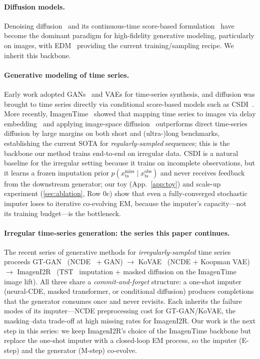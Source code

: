 \documentclass{article}
\theoremstyle{plain}
\theoremstyle{definition}
\theoremstyle{remark}
\newcommand{\xts}{x_{\mathrm{ts}}}
\begin{document}
\paragraph{Diffusion models.}
Denoising diffusion~\citep{ho2020ddpm} and its continuous-time score-based formulation~\citep{song2021sde} have become the dominant paradigm for high-fidelity generative modeling, particularly on images, with EDM~\citep{karras2022edm} providing the current training/sampling recipe. We inherit this backbone.

\paragraph{Generative modeling of time series.}
Early work adopted GANs~\citep{yoon2019timegan} and VAEs for time-series synthesis, and diffusion was brought to time series directly via conditional score-based models such as CSDI~\citep{tashiro2021csdi}. More recently, ImagenTime~\citep{naiman2024imagentime} showed that mapping time series to images via delay embedding~\citep{takens1981embedding} and applying image-space diffusion~\citep{karras2022edm} outperforms direct time-series diffusion by large margins on both short and (ultra-)long benchmarks, establishing the current SOTA for \emph{regularly-sampled} sequences; this is the backbone our method trains end-to-end on irregular data. CSDI is a natural baseline for the irregular setting because it trains on incomplete observations, but it learns a frozen imputation prior $p(\xts^{\mathrm{miss}} \mid \xts^{\mathrm{obs}})$ and never receives feedback from the downstream generator; our toy (App.~\ref{app:toy}) and scale-up experiment (\cref{sec:ablation}, Row 0c) show that even a fully-converged stochastic imputer loses to iterative co-evolving EM, because the imputer's capacity—not its training budget—is the bottleneck.

\paragraph{Irregular time-series generation: the series this paper continues.}
The recent series of generative methods for \emph{irregularly-sampled} time series proceeds GT-GAN~\citep{jeon2022gtgan} (NCDE~\citep{kidger2020ncde} + GAN) $\rightarrow$ KoVAE~\citep{naiman2024kovae} (NCDE + Koopman VAE) $\rightarrow$ ImagenI2R~\citep{fadlon2025imageni2r} (TST~\citep{zerveas2021tst} imputation + masked diffusion on the ImagenTime image lift). All three share a \emph{commit-and-forget} structure: a one-shot imputer (neural-CDE, masked transformer, or conditional diffusion) produces completions that the generator consumes once and never revisits. Each inherits the failure modes of its imputer—NCDE preprocessing cost for GT-GAN/KoVAE, the masking--data trade-off at high missing rates for ImagenI2R. Our work is the next step in this series: we keep ImagenI2R's choice of the ImagenTime backbone but replace the one-shot imputer with a closed-loop EM process, so the imputer (E-step) and the generator (M-step) co-evolve.
\end{document}
